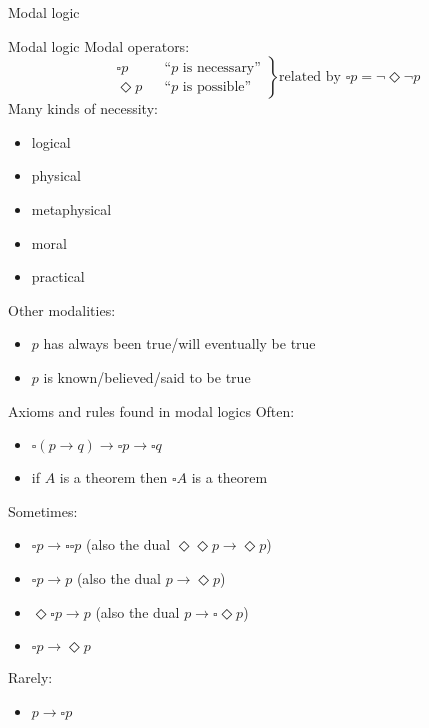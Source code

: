 \documentclass{beamer}
\newcommand{\nec}{\square}
\newcommand{\poss}{\Diamond}
\newcommand{\sect}[1]{\begin{frame}\centerline{\large #1}\end{frame}}
\begin{document}
\sect{Modal logic}

\begin{frame}{Modal logic}
Modal operators:
\[ \left.\begin{aligned}
    &\nec p && \text{``$p$ is necessary''} \\
    &\poss p && \text{``$p$ is possible''}
\end{aligned}\right\}
    \text{related by $\nec p = \lnot\poss\lnot p$} \]
Many kinds of necessity:
\begin{itemize}
\item logical
\item physical
\item metaphysical
\item moral
\item practical
\end{itemize}
Other modalities:
\begin{itemize}
\item $p$ has always been true/will eventually be true
\item $p$ is known/believed/said to be true
\end{itemize}
\end{frame}

\begin{frame}{Axioms and rules found in modal logics}
Often:
\begin{itemize}
\item $\nec (p\to q) \to \nec p \to \nec q$
\item if $A$ is a theorem then $\nec A$ is a theorem
\end{itemize}
Sometimes:
\begin{itemize}
\item $\nec p \to \nec\nec p$ (also the dual $\poss\poss p \to \poss p$)
\item $\nec p \to p$ (also the dual $p\to\poss p$)
\item $\poss\nec p \to p$ (also the dual $p\to\nec\poss p$)
\item $\nec p \to \poss p$
\end{itemize}
Rarely:
\begin{itemize}
\item $p\to\nec p$
\end{itemize}
\end{frame}
\end{document}
